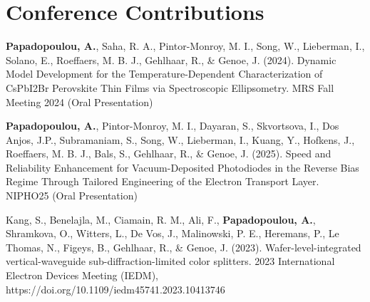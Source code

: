 \section*{Conference Contributions}

\textbf{Papadopoulou, A.}, Saha, R. A., Pintor-Monroy, M. I., Song, W., Lieberman, I., Solano, E., Roeffaers, M. B. J., Gehlhaar, R., \& Genoe, J. (2024). Dynamic Model Development for the Temperature-Dependent Characterization of CsPbI2Br Perovskite Thin Films via Spectroscopic Ellipsometry. MRS Fall Meeting 2024 (Oral Presentation)

\textbf{Papadopoulou, A.},  Pintor-Monroy, M. I., Dayaran, S., Skvortsova, I., Dos Anjos, J.P., Subramaniam, S., Song, W., Lieberman, I., Kuang, Y., Hofkens, J., Roeffaers, M. B. J., Bals, S., Gehlhaar, R., \& Genoe, J. (2025). Speed and Reliability Enhancement for Vacuum-Deposited  Photodiodes in the Reverse Bias Regime Through Tailored Engineering of the Electron Transport Layer. NIPHO25 (Oral Presentation)

Kang, S., Benelajla, M., Ciamain, R. M., Ali, F., \textbf{Papadopoulou, A.}, Shramkova, O., Witters, L., De Vos, J., Malinowski, P. E., Heremans, P., Le Thomas, N., Figeys, B., Gehlhaar, R., \& Genoe, J. (2023). Wafer-level-integrated vertical-waveguide sub-diffraction-limited color splitters. 2023 International Electron Devices Meeting (IEDM), \\ 
https://doi.org/10.1109/iedm45741.2023.10413746


\cleardoublepage

